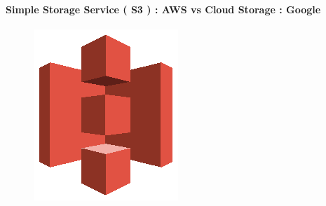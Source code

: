 \documentclass[
12pt,
english,
ngerman,
headsepline,
twoside,
openright,
numbers=noenddot,version=first
]{scrreprt}
\begin{document}
\paragraph{Simple Storage Service ( S3 ) : AWS vs Cloud Storage : Google}
\begin{figure}
	\includegraphics[width=0.9\linewidth]{./pics/aws/Storage_AmazonS3.eps}
\end{figure}
\end{document}
